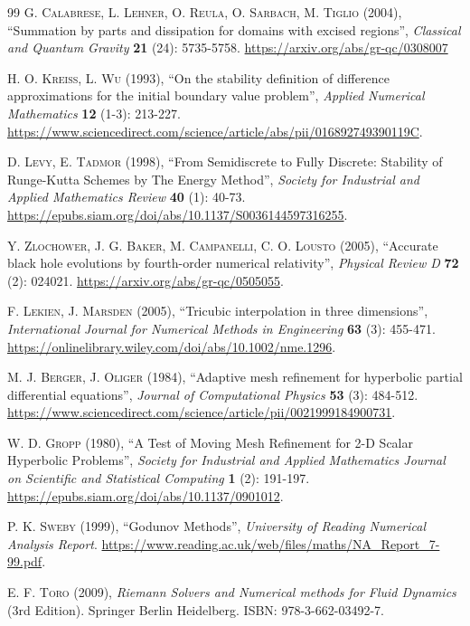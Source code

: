 \documentclass{article}
\begin{document}
\begin{thebibliography}{99}
\textsc{G. Calabrese, L. Lehner, O. Reula, O. Sarbach, M. Tiglio} (2004), ``Summation by parts and dissipation for domains with excised regions'', \textit{Classical and Quantum Gravity} \textbf{21} (24): 5735-5758. \url{https://arxiv.org/abs/gr-qc/0308007}

\textsc{H. O. Kreiss, L. Wu} (1993), ``On the stability definition of difference approximations for the initial boundary value problem'', \textit{Applied Numerical Mathematics} \textbf{12} (1-3): 213-227. \url{https://www.sciencedirect.com/science/article/abs/pii/016892749390119C}.

\textsc{D. Levy, E. Tadmor} (1998), ``From Semidiscrete to Fully Discrete: Stability of Runge-Kutta Schemes by The Energy Method'', \textit{Society for Industrial and Applied Mathematics Review} \textbf{40} (1): 40-73. \url{https://epubs.siam.org/doi/abs/10.1137/S0036144597316255}.

\textsc{Y. Zlochower, J. G. Baker, M. Campanelli, C. O. Lousto} (2005), ``Accurate black hole evolutions by fourth-order numerical relativity'', \textit{Physical Review D} \textbf{72} (2): 024021. \url{https://arxiv.org/abs/gr-qc/0505055}.

\textsc{F. Lekien, J. Marsden} (2005), ``Tricubic interpolation in three dimensions'', \textit{International Journal for Numerical Methods in Engineering} \textbf{63} (3): 455-471. \url{https://onlinelibrary.wiley.com/doi/abs/10.1002/nme.1296}.

\textsc{M. J. Berger, J. Oliger} (1984), ``Adaptive mesh refinement for hyperbolic partial differential equations'', \textit{Journal of Computational Physics} \textbf{53} (3): 484-512. \url{https://www.sciencedirect.com/science/article/pii/0021999184900731}.

\textsc{W. D. Gropp} (1980), ``A Test of Moving Mesh Refinement for 2-D Scalar Hyperbolic Problems'', \textit{Society for Industrial and Applied Mathematics Journal on Scientific and Statistical Computing} \textbf{1} (2): 191-197. \url{https://epubs.siam.org/doi/abs/10.1137/0901012}.

\textsc{P. K. Sweby} (1999), ``Godunov Methods'', \textit{University of Reading Numerical Analysis Report}. \url{https://www.reading.ac.uk/web/files/maths/NA_Report_7-99.pdf}.

\textsc{E. F. Toro} (2009), \textit{Riemann Solvers and Numerical methods for Fluid Dynamics} (3rd Edition). Springer Berlin Heidelberg. ISBN: 978-3-662-03492-7.


\end{thebibliography}
\end{document}

